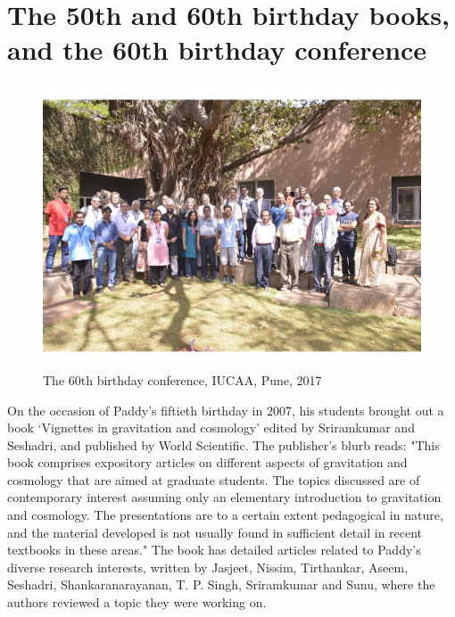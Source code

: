 \documentclass[prd, preprint, longbibliography, 11pt]{revtex4-1}
\begin{document}
\section{The 50th and 60th birthday books, and the 60th birthday conference} 
\begin{figure}[!h]
\centering
\includegraphics[width=12.00cm]{p60.jpeg}
\caption*{The 60th birthday conference, IUCAA, Pune, 2017} 
\end{figure}
On the occasion of Paddy's fiftieth birthday in 2007, his students brought out a book `Vignettes in gravitation and cosmology' edited by Sriramkumar and Seshadri, and published by World Scientific. The publisher's blurb reads: 
"This book comprises expository articles on different aspects of gravitation and cosmology that are aimed at graduate students. The topics discussed are of contemporary interest assuming only an elementary introduction to gravitation and cosmology. The presentations are to a certain extent pedagogical in nature, and the material developed is not usually found in sufficient detail in recent textbooks in these areas." The book has detailed articles related to Paddy's diverse research interests, written by Jasjeet, Nissim, Tirthankar, Aseem, Seshadri, Shankaranarayanan, T. P. Singh, Sriramkumar and Sunu, where the authors reviewed a topic they were working on.
\end{document}
